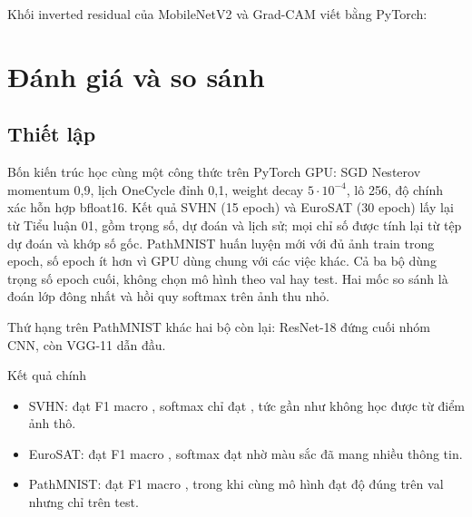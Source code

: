 Khối inverted residual của MobileNetV2 và Grad-CAM viết bằng PyTorch:


\section{Đánh giá và so sánh}

\subsection{Thiết lập}
Bốn kiến trúc học cùng một công thức trên PyTorch GPU: SGD Nesterov momentum 0,9, lịch OneCycle đỉnh 0,1, weight decay $5\cdot10^{-4}$, lô 256, độ chính xác hỗn hợp bfloat16. Kết quả SVHN (15 epoch) và EuroSAT (30 epoch) lấy lại từ Tiểu luận 01, gồm trọng số, dự đoán và lịch sử; mọi chỉ số được tính lại từ tệp dự đoán và khớp số gốc. PathMNIST huấn luyện mới với đủ  ảnh train trong  epoch, số epoch ít hơn vì GPU dùng chung với các việc khác. Cả ba bộ dùng trọng số epoch cuối, không chọn mô hình theo val hay test. Hai mốc so sánh là đoán lớp đông nhất và hồi quy softmax trên ảnh thu nhỏ.


Thứ hạng trên PathMNIST khác hai bộ còn lại: ResNet-18 đứng cuối nhóm CNN, còn VGG-11 dẫn đầu.

\begin{phathien}{Kết quả chính}
\begin{itemize}
\item SVHN:  đạt F1 macro , softmax chỉ đạt , tức gần như không học được từ điểm ảnh thô.
\item EuroSAT:  đạt F1 macro , softmax đạt  nhờ màu sắc đã mang nhiều thông tin.
\item PathMNIST:  đạt F1 macro , trong khi cùng mô hình đạt độ đúng  trên val nhưng chỉ  trên test.
\end{itemize}
\end{phathien}

